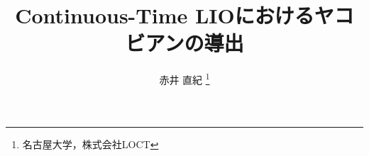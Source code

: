 \documentclass[uplatex,dvipdfmx,a4paper]{jsarticle}
\theoremstyle{plain}%
\theoremstyle{definition}
\theoremstyle{remark}
\begin{document}

\title{Continuous-Time LIOにおけるヤコビアンの導出}
\author{赤井 直紀%
  \thanks{名古屋大学，株式会社LOCT}
}

\maketitle







\end{document}
